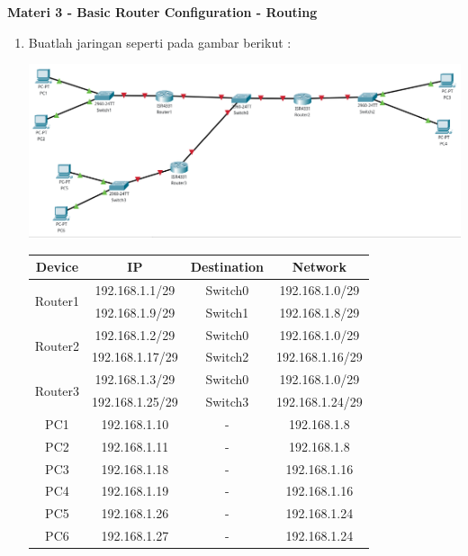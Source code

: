 \documentclass{article}
\begin{document}
    \begin{flushleft}
        \textbf{Materi 3 - Basic Router Configuration - Routing}
        \newline

        \begin{enumerate}
            \item Buatlah jaringan seperti pada gambar berikut : 
            
            \includegraphics[scale=0.3]{1-1.png}

            \begin{tabular}{|c|c|c|c|}
                \hline
                Device & IP & Destination & Network \\
                \hline
                \multirow{2}{4em}{Router1} & 192.168.1.1/29 & Switch0 & 192.168.1.0/29\\
                & 192.168.1.9/29 & Switch1 & 192.168.1.8/29 \\
                \hline
                \multirow{2}{4em}{Router2} & 192.168.1.2/29 & Switch0 & 192.168.1.0/29\\
                & 192.168.1.17/29 & Switch2 & 192.168.1.16/29 \\
                \hline
                \multirow{2}{4em}{Router3} & 192.168.1.3/29 & Switch0 & 192.168.1.0/29\\
                & 192.168.1.25/29 & Switch3 & 192.168.1.24/29 \\
                \hline
                PC1 & 192.168.1.10 & - & 192.168.1.8 \\
                \hline
                PC2 & 192.168.1.11 & - & 192.168.1.8 \\
                \hline
                PC3 & 192.168.1.18 & - & 192.168.1.16 \\
                \hline
                PC4 & 192.168.1.19 & - & 192.168.1.16 \\
                \hline
                PC5 & 192.168.1.26 & - & 192.168.1.24 \\
                \hline
                PC6 & 192.168.1.27 & - & 192.168.1.24 \\
                \hline
            \end{tabular}


\end{enumerate}
\end{flushleft}
\end{document}
